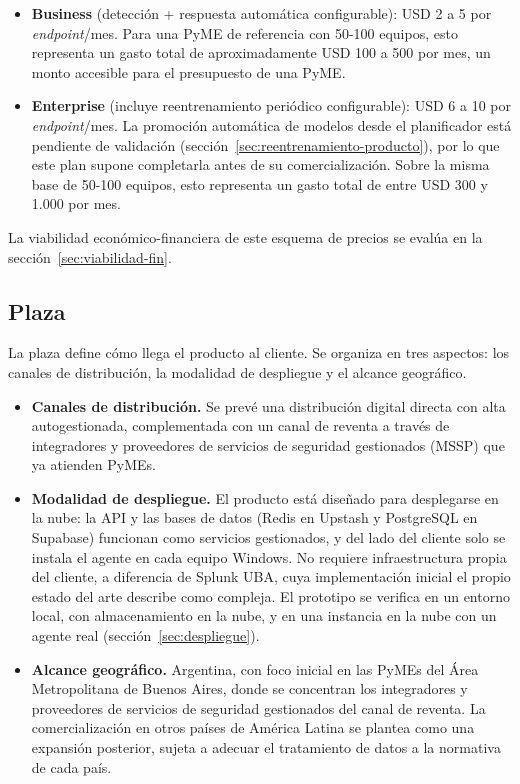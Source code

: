 \begin{itemize}
	\item \textbf{Business} (detección + respuesta automática configurable): USD 2 a 5 por \emph{endpoint}/mes. Para una PyME de referencia con 50-100 equipos, esto representa un gasto total de aproximadamente USD 100 a 500 por mes, un monto accesible para el presupuesto de una PyME.
	\item \textbf{Enterprise} (incluye reentrenamiento periódico configurable): USD 6 a 10 por \emph{endpoint}/mes. La promoción automática de modelos desde el planificador está pendiente de validación (sección~\ref{sec:reentrenamiento-producto}), por lo que este plan supone completarla antes de su comercialización. Sobre la misma base de 50-100 equipos, esto representa un gasto total de entre USD 300 y 1.000 por mes.
\end{itemize}

La viabilidad económico-financiera de este esquema de precios se evalúa en la sección~\ref{sec:viabilidad-fin}.

\subsection{Plaza}
La plaza define cómo llega el producto al cliente. Se organiza en tres aspectos: los canales de distribución, la modalidad de despliegue y el alcance geográfico.

\begin{itemize}
	\item \textbf{Canales de distribución.} Se prevé una distribución digital directa con alta autogestionada, complementada con un canal de reventa a través de integradores y proveedores de servicios de seguridad gestionados (MSSP) que ya atienden PyMEs.
	\item \textbf{Modalidad de despliegue.} El producto está diseñado para desplegarse en la nube: la API y las bases de datos (Redis en Upstash y PostgreSQL en Supabase) funcionan como servicios gestionados, y del lado del cliente solo se instala el agente en cada equipo Windows. No requiere infraestructura propia del cliente, a diferencia de Splunk UBA, cuya implementación inicial el propio estado del arte describe como compleja. El prototipo se verifica en un entorno local, con almacenamiento en la nube, y en una instancia en la nube con un agente real (sección~\ref{sec:despliegue}).
	\item \textbf{Alcance geográfico.} Argentina, con foco inicial en las PyMEs del Área Metropolitana de Buenos Aires, donde se concentran los integradores y proveedores de servicios de seguridad gestionados del canal de reventa. La comercialización en otros países de América Latina se plantea como una expansión posterior, sujeta a adecuar el tratamiento de datos a la normativa de cada país.
\end{itemize}

